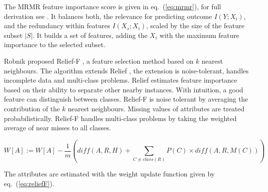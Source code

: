 \documentclass[runningheads]{llncs}
\begin{document}
The MRMR feature importance score is given in eq.~(\ref{eq:mrmr}), for full derivation see \cite{liu1995chi2,zhao2019maximum}.
It balances both, the relevance for predicting outcome $I(Y;X_i)$, and the redundancy within features $I(X_s;X_i)$, scaled by the size of the feature subset $|S|$. 
It builds a set of features, adding the $X_i$ with the maximum feature importance to the selected subset.

Robnik proposed Relief-F \cite{kononenko1994estimating}, a feature selection method based on $k$ nearest neighbours. 
The algorithm extends Relief \cite{kira1992practical}, the extension is noise-tolerant, handles incomplete data and multi-class problems. 
Relief estimates feature importance based on their ability to separate other nearby instances.
With intuition, a good feature can distinguish between classes. 
Relief-F is noise tolerant by averaging the contribution of the $k$ nearest neighbours. 
Missing values of attributes are treated probabilistically\cite{robnik2003theoretical}.
Relief-F handles multi-class problems by taking the weighted average of near misses to all classes.

\begin{equation}
  W[A] := W[A] - \frac{1}{m} \left( diff(A,R,H) +  \sum_{C \ne class(R)} P(C) \times diff(A,R,M(C)) \right)
  \label{eq:reliefF}
\end{equation}

The attributes are estimated with the weight update function given by eq.~(\ref{eq:reliefF}). 
\end{document}
